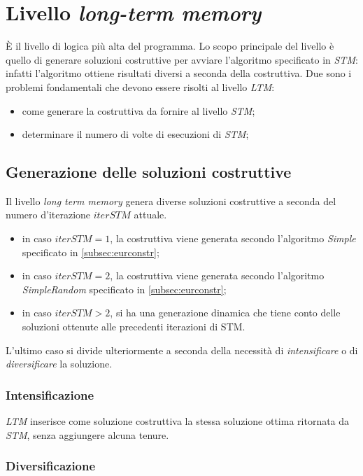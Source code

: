 \section{Livello \emph{long-term memory}}

È il livello di logica più alta del programma. Lo scopo principale del livello è quello di generare soluzioni costruttive
per avviare l'algoritmo specificato in \emph{STM}: infatti l'algoritmo ottiene risultati diversi a seconda della costruttiva.
Due sono i problemi fondamentali che devono essere risolti al livello \emph{LTM}:
\begin{itemize}
	\item come generare la costruttiva da fornire al livello \emph{STM};
	\item determinare il numero di volte di esecuzioni di \emph{STM};
\end{itemize}


\subsection{Generazione delle soluzioni costruttive}
Il livello \emph{long term memory} genera diverse soluzioni costruttive a seconda del numero d'iterazione $iterSTM$ attuale.
\begin{itemize}
	\item in caso $iterSTM = 1$, la costruttiva viene generata secondo l'algoritmo \emph{Simple} specificato in \ref{subsec:eurconstr};
	\item in caso $iterSTM = 2$, la costruttiva viene generata secondo l'algoritmo \emph{SimpleRandom} specificato in \ref{subsec:eurconstr};
	\item in caso $iterSTM > 2$, si ha una generazione dinamica che tiene conto delle soluzioni ottenute alle precedenti iterazioni di STM.
\end{itemize}
L'ultimo caso si divide ulteriormente a seconda della necessità di \emph{intensificare} o di \emph{diversificare} la soluzione. 

\subsubsection{Intensificazione}
\emph{LTM} inserisce come soluzione costruttiva la stessa soluzione ottima ritornata
da \emph{STM}, senza aggiungere alcuna tenure.

\subsubsection{Diversificazione}

